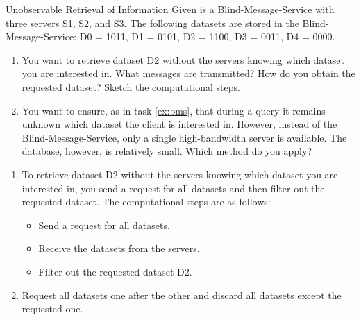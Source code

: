 \documentclass{article}
\begin{document}
\begin{exercise}{Unobservable Retrieval of Information}
  Given is a Blind-Message-Service with three servers S1, S2, and S3. The following datasets are stored in the Blind-Message-Service: D0 = 1011, D1 = 0101, D2 = 1100, D3 = 0011, D4 = 0000.
  \begin{enumerate}
    \item\label{ex:bms} You want to retrieve dataset D2 without the servers knowing which dataset you are interested in. What messages are transmitted? How do you obtain the requested dataset? Sketch the computational steps.
    \item You want to ensure, as in task \ref{ex:bms}, that during a query it remains unknown which dataset the client is interested in. However, instead of the Blind-Message-Service, only a single high-bandwidth server is available. The database, however, is relatively small. Which method do you apply?
  \end{enumerate}

  \begin{solution}
    \begin{enumerate}
      \item To retrieve dataset D2 without the servers knowing which dataset you are interested in, you send a request for all datasets and then filter out the requested dataset. The computational steps are as follows:
        \begin{itemize}
          \item Send a request for all datasets.
          \item Receive the datasets from the servers.
          \item Filter out the requested dataset D2.
        \end{itemize}
      \item Request all datasets one after the other and discard all datasets except the requested one.
    \end{enumerate}
  \end{solution}
\end{exercise}
\end{document}
